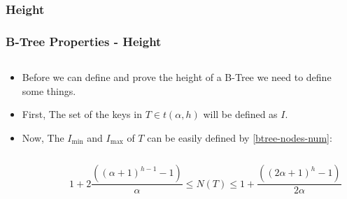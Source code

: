 \documentclass{beamer}
\begin{document}
\begin{frame}
    \subsubsection{Height}
    \frametitle{B-Tree Properties - Height}
    \begin{columns}
        \begin{column}{\textlecolumn}
            \begin{block}{}
                \begin{itemize}
                    \item Before we can define and prove the height of a B-Tree we need to define some things.
                    \item First, The set of the keys in \(T \in t\left(\alpha, h\right)\) will be defined as \(I\). 
                    \item Now, The \(I_{\text{min}}\) and \(I_{\text{max}}\) of \(T\) can be easily defined by \eqref{btree-nodes-num}:
                \end{itemize}
            \end{block}
        \end{column}
        \begin{column}{\textricolumn}
        \end{column}
    \end{columns}
    \begin{columns}
        \begin{column}{\textricolumn} %
        \end{column}
        \begin{column}{\textlecolumn}
            \vspace{-0.35cm}
            \begin{tcolorbox}[boxsep=0mm,left=0mm,right=0mm,top=-2mm,halign=right]
                \[
                    1 + 2\frac{\left(\left(\alpha + 1\right)^{h - 1} - 1\right)}{\alpha} 
                    \leq 
                    N\left(T\right) 
                    \leq 
                    1 + \frac{\left(\left(2\alpha + 1\right)^{h} - 1\right)}{2\alpha}
                \]
            \end{tcolorbox}
        \end{column}
    \end{columns}
    \begin{columns}
        \begin{column}{\textlecolumn}

\end{column}
\end{columns}
\end{frame}
\end{document}
